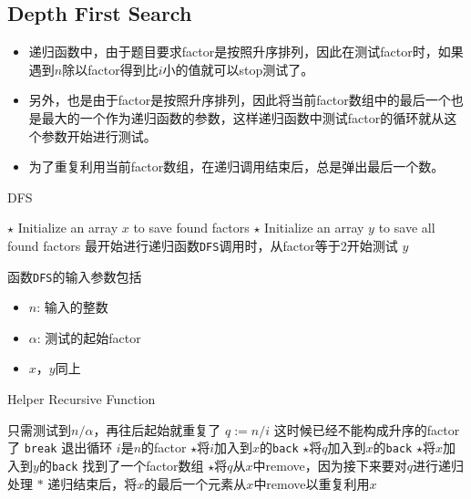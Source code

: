 \subsection{Depth First Search}
\begin{itemize}
\item 递归函数中，由于题目要求factor是按照升序排列，因此在测试factor时，如果遇到$n$除以factor得到比$i$小的值就可以stop测试了。
\item 另外，也是由于factor是按照升序排列，因此将当前factor数组中的最后一个也是最大的一个作为递归函数的参数，这样递归函数中测试factor的循环就从这个参数开始进行测试。
\item 为了重复利用当前factor数组，在递归调用结束后，总是弹出最后一个数。
\end{itemize}
\setcounter{algorithm}{0}
\begin{algorithm}[H]
\caption{DFS}
\begin{algorithmic}[1]
\State $\star$ Initialize an array $x$ to save found factors
\State $\star$ Initialize an array $y$ to save all found factors
\State {} \Comment 最开始进行递归函数\texttt{DFS}调用时，从factor等于2开始测试
\State \Return $y$
\EndProcedure
\end{algorithmic}
\end{algorithm}
函数\texttt{DFS}的输入参数包括
\begin{itemize}
\item $n$: 输入的整数
\item $\alpha$: 测试的起始factor
\item $x$，$y$同上
\end{itemize}
\begin{algorithm}[H]
\caption{Helper Recursive Function}
\begin{algorithmic}[1]
 \Comment 只需测试到$n/\alpha$，再往后起始就重复了
\State $q:=n/i$
 \Comment 这时候已经不能构成升序的factor了
\State \texttt{break} \Comment 退出循环
\EndIf
{} \Comment $i$是$n$的factor
\State $\star$将$i$加入到$x$的\texttt{back}
\State $\star$将$q$加入到$x$的\texttt{back}
\State $\star$将$x$加入到$y$的\texttt{back} \Comment 找到了一个factor数组
\State $\star$将$q$从$x$中remove，因为接下来要对$q$进行递归处理
\State {}
\State $\ast$ 递归结束后，将$x$的最后一个元素从$x$中remove以重复利用$x$
\EndIf
\EndFor
\EndProcedure
\end{algorithmic}
\end{algorithm}
